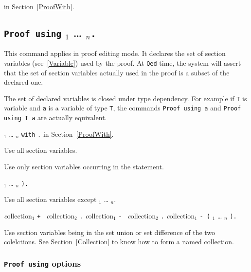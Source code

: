  in Section~\ref{ProofWith}.

\subsection[{\tt Proof using} {\ident$_1$} {\ldots} {\ident$_n$}{\tt .}]
{{\tt Proof using} {\ident$_1$} {\ldots} {\ident$_n$}{\tt .}
 \label{ProofUsing}}

This command applies in proof editing mode. 
It declares the set of section variables (see~\ref{Variable}) 
used by the proof. At {\tt Qed} time, the system will assert that 
the set of section variables actually used in the proof is a subset of
the declared one.

The set of declared variables is closed under type dependency.
For example if {\tt T} is variable and {\tt a} is a variable of
type {\tt T}, the commands {\tt Proof using a} and
{\tt Proof using T a} are actually equivalent.

 {\ident$_1$} {\ldots} {\ident$_n$} {\tt with} {\tac}{\tt .} 
in Section~\ref{ProofWith}.


  Use all section variables.

  
  Use only section variables occurring in the statement.

 {\ident$_1$} {\ldots} {\ident$_n$} {\tt ).}
  
  Use all section variables except {\ident$_1$} {\ldots} {\ident$_n$}.

  {\emph collection$_1$} {\tt + } {\emph collection$_2$} {\tt .}
  {\emph collection$_1$} {\tt - } {\emph collection$_2$} {\tt .}
  {\emph collection$_1$} {\tt - (} {\ident$_1$} {\ldots} {\ident$_n$} {\tt ).}

  Use section variables being in the set union or set difference of the two
  colelctions.  See Section~\ref{Collection} to know how to form a named
  collection.

\subsubsection{{\tt Proof using} options}

